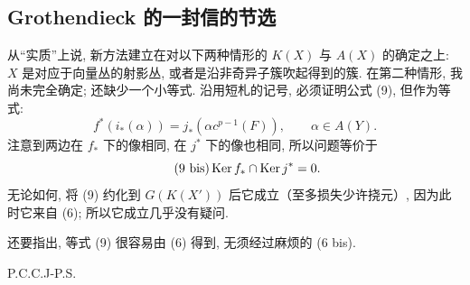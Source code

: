 \subsection*{Grothendieck 的一封信的节选}
从“实质”上说, 新方法建立在对以下两种情形的 \(K(X)\) 与 \(A(X)\) 的确定之上: \(X\) 是对应于向量丛的射影丛, 或者是沿非奇异子簇吹起得到的簇. 在第二种情形, 我尚未完全确定; 还缺少一个小等式. 沿用短札的记号, 必须证明公式 (9), 但作为等式:
\begin{equation}\tag{9}
  f^*(i_*(\alpha))=j_*(\alpha c^{p-1}(F)),\qquad \alpha\in A(Y).
\end{equation}
注意到两边在 \(f_*\) 下的像相同, 在 \(j^*\) 下的像也相同, 所以问题等价于
\begin{equation}\tag{9 bis}
  \operatorname{Ker} f_*\cap\operatorname{Ker} j^*=0.
\end{equation}
无论如何, 将 (9) 约化到 \(G(K(X'))\) 后它成立（至多损失少许挠元）, 因为此时它来自 (6); 所以它成立几乎没有疑问.

还要指出, 等式 (9) 很容易由 (6) 得到, 无须经过麻烦的 (6 bis).

\begin{flushleft}
P.C.C.J-P.S.
\end{flushleft}

\newpage
